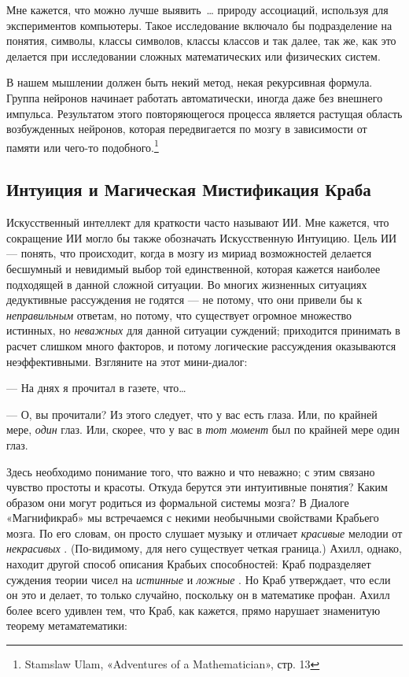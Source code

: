 \documentclass[../main.tex]{subfiles}
\begin{document}
Мне кажется, что можно лучше выявить~\ldots{} природу ассоциаций, используя для экспериментов компьютеры. Такое исследование включало бы подразделение на понятия, символы, классы символов, классы классов и так далее, так же, как это делается при исследовании сложных математических или физических систем.

В нашем мышлении должен быть некий метод, некая рекурсивная формула. Группа нейронов начинает работать автоматически, иногда даже без внешнего импульса. Результатом этого повторяющегося процесса является растущая область возбужденных нейронов, которая передвигается по мозгу в зависимости от памяти или чего-то подобного.\footnote{Stamslaw Ulam, «Adventures of a Mathematician», стр. 13}


\subsection{Интуиция и Магическая Мистификация Краба}

Искусственный интеллект для краткости часто называют ИИ\@. Мне кажется, что сокращение ИИ могло бы также обозначать Искусственную Интуицию. Цель ИИ --- понять, что происходит, когда в мозгу из мириад возможностей делается бесшумный и невидимый выбор той единственной, которая кажется наиболее подходящей в данной сложной ситуации. Во многих жизненных ситуациях дедуктивные рассуждения не годятся --- не потому, что они привели бы к \emph{неправильным} ответам, но потому, что существует огромное множество истинных, но \emph{неважных} для данной ситуации суждений; приходится принимать в расчет слишком много факторов, и потому логические рассуждения оказываются неэффективными. Взгляните на этот мини-диалог:

--- На днях я прочитал в газете, что\ldots{}

--- О, вы прочитали? Из этого следует, что у вас есть глаза. Или, по крайней мере, \emph{один} глаз. Или, скорее, что у вас в \emph{тот момент} был по крайней мере один глаз.

Здесь необходимо понимание того, что важно и что неважно; с этим связано чувство простоты и красоты. Откуда берутся эти интуитивные понятия? Каким образом они могут родиться из формальной системы мозга? В Диалоге «Магнификраб» мы встречаемся с некими необычными свойствами Крабьего мозга. По его словам, он просто слушает музыку и отличает \emph{красивые} мелодии от \emph{некрасивых} . (По-видимому, для него существует четкая граница.) Ахилл, однако, находит другой способ описания Крабьих способностей: Краб подразделяет суждения теории чисел на \emph{истинные} и \emph{ложные} . Но Краб утверждает, что если он это и делает, то только случайно, поскольку он в математике профан. Ахилл более всего удивлен тем, что Краб, как кажется, прямо нарушает знаменитую теорему метаматематики:
\end{document}
